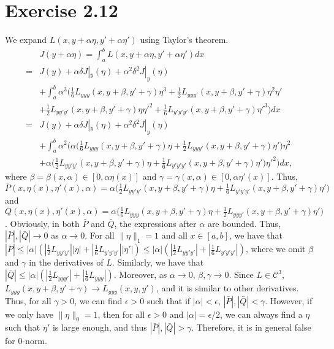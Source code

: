 \documentclass[11pt]{report}
\begin{document}
\section*{Exercise 2.12}
We expand $L(x,y+\alpha \eta, y'+\alpha \eta')$ using Taylor's theorem.
\begin{align*}
& J(y+\alpha \eta) = \int_a^b L(x,y+\alpha \eta, y'+\alpha \eta') dx\\
= & J(y) + \alpha \delta J|_y(\eta) + \alpha^2 \delta^2 J|_y(\eta)\\ &+ \int_a^b \alpha^3 \Big(\frac{1}{6} L_{yyy}(x,y+\beta, y'+\gamma)\eta^3 + \frac{1}{2} L_{yyy'}(x,y+\beta, y'+\gamma)\eta^2\eta'\\ &+ \frac{1}{2} L_{yy'y'}(x,y+\beta, y'+\gamma)\eta\eta'^2 + \frac{1}{6} L_{y'y'y'}(x,y+\beta, y'+\gamma)\eta'^3\Big)dx\\
= & J(y) + \alpha \delta J|_y(\eta) + \alpha^2 \delta^2 J|_y(\eta)\\ &+ \int_a^b \alpha^2 \Big(\alpha\big(\frac{1}{6} L_{yyy}(x,y+\beta, y'+\gamma)\eta + \frac{1}{2} L_{yyy'}(x,y+\beta, y'+\gamma)\eta'\big)\eta^2\\ &+ \alpha\big(\frac{1}{2} L_{yy'y'}(x,y+\beta, y'+\gamma)\eta + \frac{1}{6} L_{y'y'y'}(x,y+\beta, y'+\gamma)\eta'\big)\eta'^2\Big)dx,
\end{align*}
where $\beta = \beta(x,\alpha) \in [0, \alpha\eta(x)]$ and $\gamma = \gamma(x,\alpha) \in [0, \alpha\eta'(x)]$. Thus, $\bar{P}(x,\eta(x),\eta'(x),\alpha) = \alpha\big(\frac{1}{2} L_{yy'y'}(x,y+\beta, y'+\gamma)\eta + \frac{1}{6} L_{y'y'y'}(x,y+\beta, y'+\gamma)\eta'\big)$ and $\bar{Q}(x,\eta(x),\eta'(x),\alpha) = \alpha\big(\frac{1}{6} L_{yyy}(x,y+\beta, y'+\gamma)\eta + \frac{1}{2} L_{yyy'}(x,y+\beta, y'+\gamma)\eta'\big)$. Obviously, in both $\bar{P}$ and $\bar{Q}$, the expressions after $\alpha$ are bounded. Thus, $|\bar{P}|, |\bar{Q}| \to 0$ as $\alpha \to 0$. For all $\|\eta\|_1 = 1$ and all $x \in [a,b]$, we have that $|\bar{P}| \leq |\alpha|\left(\left|\frac{1}{2}L_{yy'y'}\right|\left|\eta\right| + \left|\frac{1}{6}L_{y'y'y'}\right|\left|\eta'\right|\right) \leq |\alpha|\left(\left|\frac{1}{2}L_{yy'y'}\right| + \left|\frac{1}{6}L_{y'y'y'}\right|\right)$, where we omit $\beta$ and $\gamma$ in the derivatives of $L$. Similarly, we have that $|\bar{Q}| \leq |\alpha|\left(\left|\frac{1}{2}L_{yyy'}\right| + \left|\frac{1}{6}L_{yyy}\right|\right)$. Moreover, as $\alpha \to 0$, $\beta, \gamma \to 0$. Since $L \in \mathcal{C}^3$, $L_{yyy}(x, y+\beta, y'+\gamma) \to L_{yyy}(x, y, y')$, and it is similar to other derivatives. Thus, for all $\gamma > 0$, we can find $\epsilon > 0$ such that if $|\alpha| < \epsilon$, $|\bar{P}|, |\bar{Q}| < \gamma$. However, if we only have $\|\eta\|_0 = 1$, then for all $\epsilon > 0$ and $|\alpha| = \epsilon / 2$, we can always find a $\eta$ such that $\eta'$ is large enough, and thus $|\bar{P}|, |\bar{Q}| > \gamma$. Therefore, it is in general false for $0$-norm.
\end{document}
